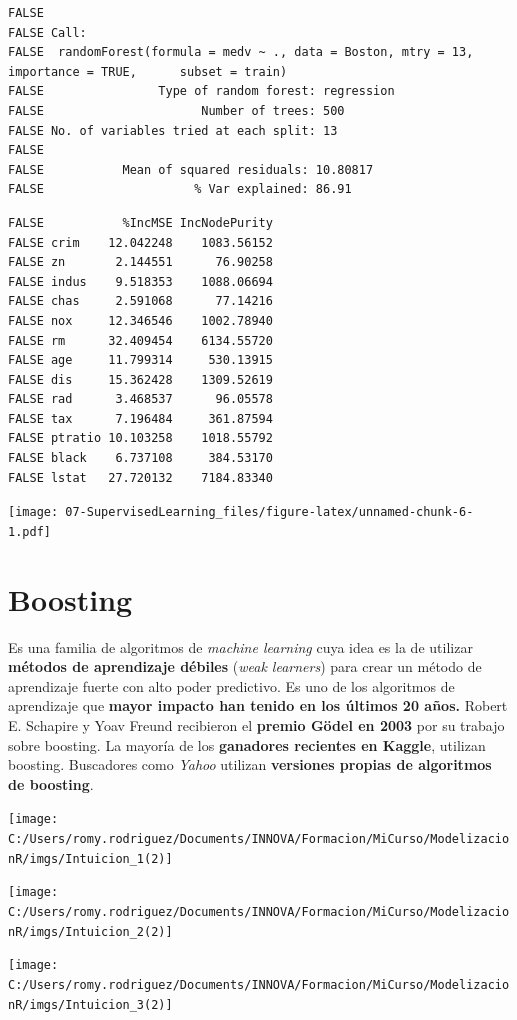 \documentclass[]{book}
\begin{document}
\begin{verbatim}
FALSE 
FALSE Call:
FALSE  randomForest(formula = medv ~ ., data = Boston, mtry = 13, importance = TRUE,      subset = train) 
FALSE                Type of random forest: regression
FALSE                      Number of trees: 500
FALSE No. of variables tried at each split: 13
FALSE 
FALSE           Mean of squared residuals: 10.80817
FALSE                     % Var explained: 86.91
\end{verbatim}

\begin{verbatim}
FALSE           %IncMSE IncNodePurity
FALSE crim    12.042248    1083.56152
FALSE zn       2.144551      76.90258
FALSE indus    9.518353    1088.06694
FALSE chas     2.591068      77.14216
FALSE nox     12.346546    1002.78940
FALSE rm      32.409454    6134.55720
FALSE age     11.799314     530.13915
FALSE dis     15.362428    1309.52619
FALSE rad      3.468537      96.05578
FALSE tax      7.196484     361.87594
FALSE ptratio 10.103258    1018.55792
FALSE black    6.737108     384.53170
FALSE lstat   27.720132    7184.83340
\end{verbatim}

\texttt{[image: 07-SupervisedLearning\_files/figure-latex/unnamed-chunk-6-1.pdf]}

\hypertarget{boosting}{%
\section{Boosting}\label{boosting}}

Es una familia de algoritmos de \emph{machine learning} cuya idea es la de utilizar \textbf{métodos de aprendizaje débiles} (\emph{weak learners}) para crear un método de aprendizaje fuerte con alto poder predictivo. Es uno de los algoritmos de aprendizaje que \textbf{mayor impacto han tenido en los últimos 20 años.} Robert E. Schapire y Yoav Freund recibieron el \textbf{premio Gödel en 2003} por su trabajo sobre boosting. La mayoría de los \textbf{ganadores recientes en Kaggle}, utilizan boosting. Buscadores como \emph{Yahoo} utilizan \textbf{versiones propias de algoritmos de boosting}.

\texttt{[image: C:/Users/romy.rodriguez/Documents/INNOVA/Formacion/MiCurso/ModelizacionR/imgs/Intuicion\_1(2)]}

\texttt{[image: C:/Users/romy.rodriguez/Documents/INNOVA/Formacion/MiCurso/ModelizacionR/imgs/Intuicion\_2(2)]}

\texttt{[image: C:/Users/romy.rodriguez/Documents/INNOVA/Formacion/MiCurso/ModelizacionR/imgs/Intuicion\_3(2)]}
\end{document}
